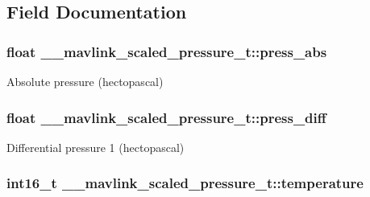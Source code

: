 \subsection{Field Documentation}
\hypertarget{struct____mavlink__scaled__pressure__t_a934eb017154df68b78c6448a9c568d56}{
\subsubsection[{press\+\_\+abs}]{\setlength{\rightskip}{0pt plus 5cm}float \+\_\+\+\_\+mavlink\+\_\+scaled\+\_\+pressure\+\_\+t\+::press\+\_\+abs}}\label{struct____mavlink__scaled__pressure__t_a934eb017154df68b78c6448a9c568d56}


Absolute pressure (hectopascal) 

\hypertarget{struct____mavlink__scaled__pressure__t_a44d34c48be09332608a4d9dc36a809cb}{
\subsubsection[{press\+\_\+diff}]{\setlength{\rightskip}{0pt plus 5cm}float \+\_\+\+\_\+mavlink\+\_\+scaled\+\_\+pressure\+\_\+t\+::press\+\_\+diff}}\label{struct____mavlink__scaled__pressure__t_a44d34c48be09332608a4d9dc36a809cb}


Differential pressure 1 (hectopascal) 

\hypertarget{struct____mavlink__scaled__pressure__t_ac9c9eba0a5fce8ca9324859b1b9ab413}{
\subsubsection[{temperature}]{\setlength{\rightskip}{0pt plus 5cm}int16\+\_\+t \+\_\+\+\_\+mavlink\+\_\+scaled\+\_\+pressure\+\_\+t\+::temperature}}\label{struct____mavlink__scaled__pressure__t_ac9c9eba0a5fce8ca9324859b1b9ab413}


